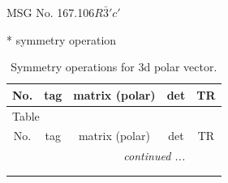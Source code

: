 \documentclass[fleqn,8pt]{jsarticle}
\begin{document}
\setcounter{MaxMatrixCols}{32}

\renewcommand{\tablename}{Table~}
\renewcommand{\figurename}{Figure~}
\begin{center}
\LARGE
MSG No. 167.106\quad$R\bar{3}'c'$
\end{center}
* symmetry operation
\renewcommand{\arraystretch}{1.3}
\begin{longtable}{ccccc}
\caption{Symmetry operations for 3d polar vector.}
 \\
 \hline \hline
No. & tag & matrix (polar) & det & TR \\ \hline \endfirsthead

\multicolumn{4}{l}{\tablename\ \thetable{}} \\
 \hline \hline
No. & tag & matrix (polar) & det & TR \\ \hline \endhead

 \hline \hline
\multicolumn{4}{r}{\footnotesize\it continued ...} \\ \endfoot

 \hline \hline
\multicolumn{4}{r}{} \\ \endlastfoot


\end{longtable}
\end{document}
